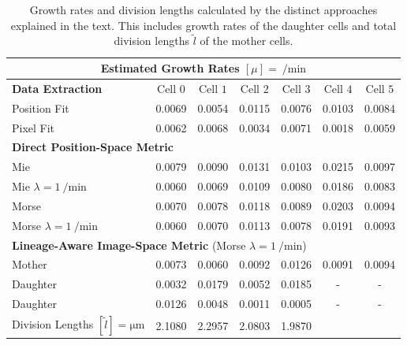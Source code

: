 \begin{table}[H]
    \centering
    \begin{tabular}{l c c c c c c}
        \multicolumn{7}{c}{Estimated Growth Rates $[\mu]=\SI{}{\per\minute}$}\\
        \toprule
        \textbf{Data Extraction} & Cell $0$ & Cell $1$ & Cell $2$ & Cell $3$ & Cell $4$ & Cell $5$\\
        \midrule
        Position Fit & 0.0069 & 0.0054 & 0.0115 & 0.0076 & 0.0103 & 0.0084\\
        Pixel Fit    & 0.0062 & 0.0068 & 0.0034 & 0.0071 & 0.0018 & 0.0059 \vspace{0.2cm}\\
        \multicolumn{7}{l}{\textbf{Direct Position-Space Metric}}\\
        \midrule
        Mie                                 & 0.0079 & 0.0090 & 0.0131 & 0.0103 & 0.0215 & 0.0097\\
        Mie $\lambda=\SI{1}{\per\minute}$   & 0.0060 & 0.0069 & 0.0109 & 0.0080 & 0.0186 & 0.0083\\
        Morse                               & 0.0070 & 0.0078 & 0.0118 & 0.0089 & 0.0203 & 0.0094\\
        Morse $\lambda=\SI{1}{\per\minute}$ & 0.0060 & 0.0070 & 0.0113 & 0.0078 & 0.0191 & 0.0093 \vspace{0.2cm}\\

        \multicolumn{7}{l}{\textbf{Lineage-Aware Image-Space Metric} (Morse $\lambda=\SI{1}{\per\minute}$)}\\
        \midrule
        Mother                              & 0.0073 & 0.0060 & 0.0092 & 0.0126 & 0.0091 & 0.0094\\
        Daughter                            & 0.0032 & 0.0179 & 0.0052 & 0.0185 & - & -\\
        Daughter                            & 0.0126 & 0.0048 & 0.0011 & 0.0005 & - & -\\
        Division Lengths $[\tilde{l}]=\unit{\micro\metre}$
                                            & 2.1080 & 2.2957 & 2.0803 & 1.9870\\
        \bottomrule
    \end{tabular}
    \caption[Comparison of Fitted Growth Rates and Division Lengths]{
        Growth rates and division lengths calculated by the distinct approaches explained in the
        text.
        This includes growth rates of the daughter cells and total division lengths $\tilde{l}$ of
        the mother cells.
    }
    \label{tab:comparison-growth-rates}
\end{table}

